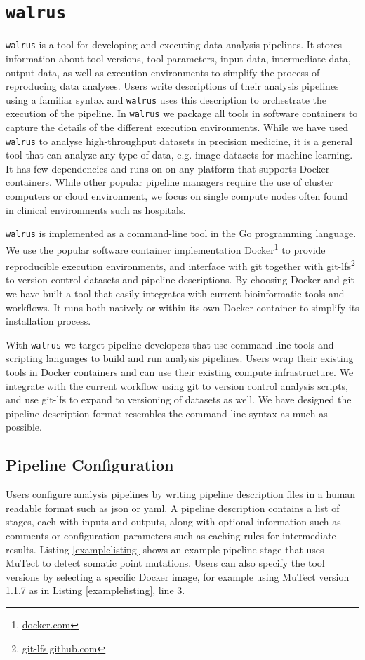\section{\texttt{walrus}} 
\texttt{walrus} is a tool for developing and executing data analysis pipelines.
It stores information about tool versions, tool parameters, input data,
intermediate data, output data, as well as execution environments to simplify
the process of reproducing data analyses. Users write descriptions of their
analysis pipelines using a familiar syntax and \texttt{walrus}  uses this
description to orchestrate the execution of the pipeline. In \texttt{walrus}  we
package all tools in software containers to capture the details of the different
execution environments. While we have used \texttt{walrus}  to analyse
high-throughput datasets in precision medicine, it is a general tool that can
analyze any type of data, e.g. image datasets for machine learning. It has few
dependencies and runs on on any platform that supports Docker containers. While
other popular pipeline managers require the use of cluster computers or cloud
environment, we focus on single compute nodes often found in clinical
environments such as hospitals. 

\texttt{walrus}  is implemented as a command-line tool in the Go programming
language. We use the popular software container implementation
Docker\footnote{\url{docker.com}} to provide reproducible execution
environments, and interface with git together with
git-lfs\footnote{\url{git-lfs.github.com}} to version control datasets and
pipeline descriptions. By choosing Docker and git we have built a tool that
easily integrates with current bioinformatic tools and workflows. It runs both
natively or within its own Docker container to simplify its installation
process.

With \texttt{walrus} we target pipeline developers that use command-line tools
and scripting languages to build and run analysis pipelines. Users wrap their
existing tools in Docker containers and can use their existing compute
infrastructure.  We integrate with the current workflow using git to version
control analysis scripts, and use git-lfs to expand to versioning of datasets as
well. We have designed the pipeline description format resembles the command
line syntax as much as possible. 

\subsection{Pipeline Configuration}
Users configure analysis pipelines by writing pipeline description files in a
human readable format such as \gls{json} or \gls{yaml}. A pipeline description
contains a list of stages, each with inputs and outputs, along with optional
information such as comments or configuration parameters such as caching rules
for intermediate results. Listing \ref{examplelisting} shows an example pipeline
stage that uses MuTect\cite{mutect} to detect somatic point mutations. Users
can also specify the tool versions by selecting a specific Docker image, for
example using MuTect version 1.1.7 as in Listing \ref{examplelisting}, line 3. 

